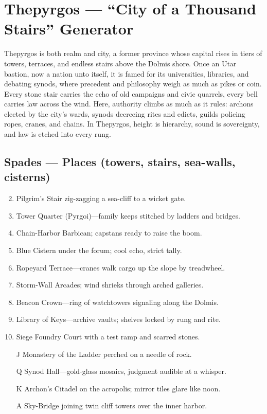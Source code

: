 \section{Thepyrgos --- ``City of a Thousand Stairs'' Generator}
\label{chap:thepyrgos}

Thepyrgos is both realm and city, a former province whose capital rises in tiers of towers, terraces, and endless stairs above the Dolmis shore. Once an Utar bastion, now a nation unto itself, it is famed for its universities, libraries, and debating synods, where precedent and philosophy weigh as much as pikes or coin. Every stone stair carries the echo of old campaigns and civic quarrels, every bell carries law across the wind. Here, authority climbs as much as it rules: archons elected by the city’s wards, synods decreeing rites and edicts, guilds policing ropes, cranes, and chains. In Thepyrgos, height is hierarchy, sound is sovereignty, and law is etched into every rung.

\subsection*{Spades --- Places (towers, stairs, sea-walls, cisterns)}
\label{sec:thepyrgos-places}
\begin{enumerate}
\setcounter{enumi}{1}
\item Pilgrim's Stair zig-zagging a sea-cliff to a wicket gate.
\item Tower Quarter (Pyrgoi)---family keeps stitched by ladders and bridges.
\item Chain-Harbor Barbican; capstans ready to raise the boom.
\item Blue Cistern under the forum; cool echo, strict tally.
\item Ropeyard Terrace---cranes walk cargo up the slope by treadwheel.
\item Storm-Wall Arcades; wind shrieks through arched galleries.
\item Beacon Crown---ring of watchtowers signaling along the Dolmis.
\item Library of Keys---archive vaults; shelves locked by rung and rite.
\item Siege Foundry Court with a test ramp and scarred stones.
\item[J] Monastery of the Ladder perched on a needle of rock.
\item[Q] Synod Hall---gold-glass mosaics, judgment audible at a whisper.
\item[K] Archon's Citadel on the acropolis; mirror tiles glare like noon.
\item[A] Sky-Bridge joining twin cliff towers over the inner harbor.
\end{enumerate}

